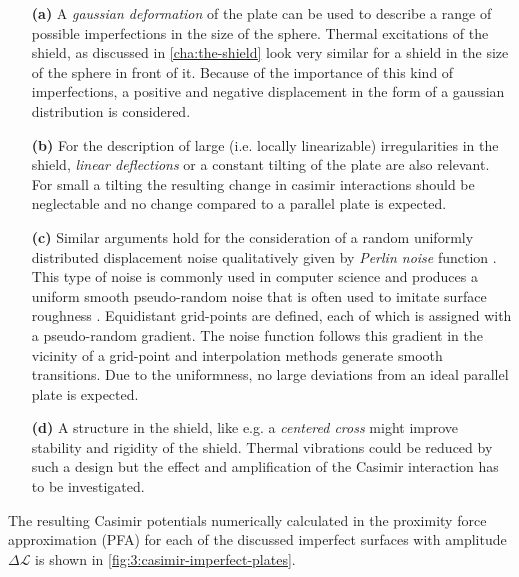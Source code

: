 \begin{enumerate}
  \item[\textbf{(a)}] A \textit{gaussian deformation} of the plate can be used to describe a range of possible imperfections in the size of the sphere. Thermal excitations of the shield, as discussed in \cref{cha:the-shield} look very similar for a shield in the size of the sphere in front of it. Because of the importance of this kind of imperfections, a positive and negative displacement in the form of a gaussian distribution is considered.
  \item[\textbf{(b)}] For the description of large (i.e. locally linearizable) irregularities in the shield, \textit{linear deflections} or a constant tilting of the plate are also relevant. For small a tilting the resulting change in casimir interactions should be neglectable and no change compared to a parallel plate is expected.
  \item[\textbf{(c)}] Similar arguments hold for the consideration of a random uniformly distributed displacement noise qualitatively given by \textit{Perlin noise} function \cite{Perlin_1985}. This type of noise is commonly used in computer science and produces a uniform smooth pseudo-random noise that is often used to imitate surface roughness \cite{Perlin_1985}. Equidistant grid-points are defined, each of which is assigned with a pseudo-random gradient. The noise function follows this gradient in the vicinity of a grid-point and interpolation methods generate smooth transitions. Due to the uniformness, no large deviations from an ideal parallel plate is expected.
  \item[\textbf{(d)}] A structure in the shield, like e.g. a \textit{centered cross} might improve stability and rigidity of the shield. Thermal vibrations could be reduced by such a design but the effect and amplification of the Casimir interaction has to be investigated.
\end{enumerate}
The resulting Casimir potentials numerically calculated in the proximity force approximation (PFA) for each of the discussed imperfect surfaces with amplitude $\Delta \mathscr{L}$ is shown in \cref{fig:3:casimir-imperfect-plates}.
